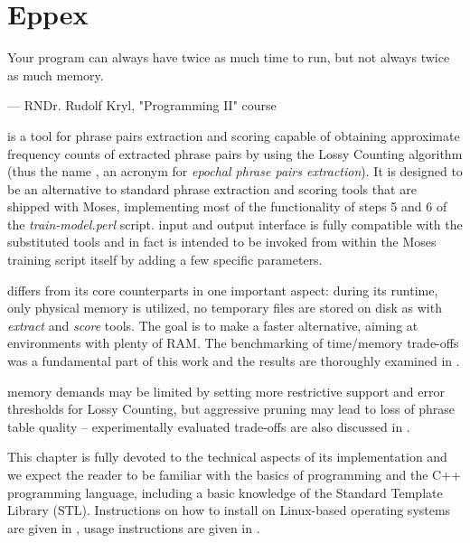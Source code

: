 
\chapter{Eppex}
\label{chap:eppex}

\setlength{\epigraphwidth}{1.0\textwidth}
\epigraph{Your program can always have twice as much time to run, but not always twice as much memory.}{--- RNDr. Rudolf Kryl, "Programming II" course}

\Eppex{} is a tool for phrase pairs extraction and scoring capable of obtaining approximate
frequency counts of extracted phrase pairs by using the Lossy Counting algorithm
(thus the name \eppex{}, an acronym for \emph{epochal phrase pairs extraction}).
It is designed to be an alternative to standard phrase extraction and scoring tools that
are shipped with Moses, implementing most of the functionality of steps 5 and 6 of the
\emph{train-model.perl} script.
\Eppex{} input and output interface is fully compatible with the substituted tools
and \eppex{} in fact is intended to be invoked from within the Moses training script itself
by adding a few specific parameters.

\Eppex{} differs from its core counterparts in one important aspect: during its runtime,
only physical memory is utilized, no temporary files are stored on disk as with \emph{extract}
and \emph{score} tools.
The goal is to make \eppex{} a faster alternative, aiming at environments with plenty of RAM.
The benchmarking of time/memory trade-offs was a fundamental part of this work and the results are
thoroughly examined in .

\Eppex{} memory demands may be limited by setting more restrictive support and error thresholds
for Lossy Counting, but aggressive pruning may lead to loss of phrase table quality --
experimentally evaluated trade-offs are also discussed in .

This chapter is fully devoted to the technical aspects of its implementation and we expect the reader
to be familiar with the basics of programming and the C++ programming language, including
a basic knowledge of the Standard Template Library (STL).
Instructions on how to install \eppex{} on Linux-based operating systems are given in
, usage instructions are given in .

